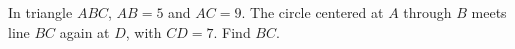 In triangle $ABC$, $AB=5$ and $AC=9$. The circle centered at $A$ through $B$ meets line $BC$ again at $D$, with $CD=7$. Find $BC$.
